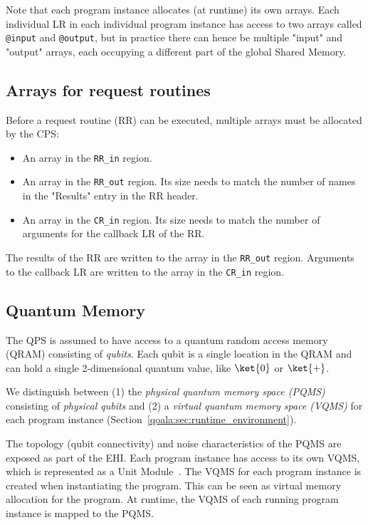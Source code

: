 Note that each program instance allocates (at runtime) its own arrays. Each individual LR in each individual program instance has access to two arrays called \texttt{@input}  and \texttt{@output}, but in practice there can hence be multiple "input" and "output" arrays, each occupying a different part of the global Shared Memory.


\subsection{Arrays for request routines}
Before a request routine (RR) can be executed, multiple arrays must be allocated by the CPS:
\begin{itemize}
\item An array in the \texttt{RR\_in} region. 
\item An array in the \texttt{RR\_out} region. Its size needs to match the number of names in the "Results" entry in the RR header.
\item An array in the \texttt{CR\_in} region. Its size needs to match the number of arguments for the callback LR of the RR.
\end{itemize}

The results of the RR are written to the array in the \mbox{\texttt{RR\_out}} region. Arguments to the callback LR are written to the array in the \texttt{CR\_in} region.



\subsection{Quantum Memory}
\label{qoala:sec:app:quantum_memory}
The QPS is assumed to have access to a quantum random access memory (QRAM) consisting of \textit{qubits}.
Each qubit is a single location in the QRAM and can hold a single 2-dimensional quantum value, like $\ket{0}$ or $\ket{+}$.

We distinguish between (1) the \textit{physical quantum memory space (PQMS)} consisting of \textit{physical qubits}
and (2) a \textit{virtual quantum memory space (VQMS)} for each program instance (Section~\ref{qoala:sec:runtime_environment}).

The topology (qubit connectivity) and noise characteristics of the PQMS are exposed as part of the EHI.
Each program instance has access to its own VQMS, which is represented as a Unit Module~\cite{dahlberg2022netqasm}.
The VQMS for each program instance is created when instantiating the program.
This can be seen as virtual memory allocation for the program.
At runtime, the VQMS of each running program instance is mapped to the PQMS.


